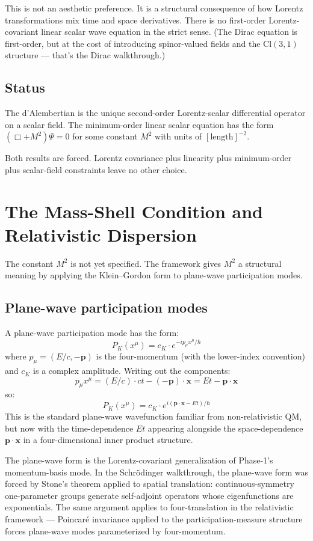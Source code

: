 \documentclass[11pt,a4paper]{article}
\begin{document}
This is not an aesthetic preference. It is a structural consequence of how Lorentz transformations mix time and space derivatives. There is no first-order Lorentz-covariant linear scalar wave equation in the strict sense. (The Dirac equation is first-order, but at the cost of introducing spinor-valued fields and the $\mathrm{Cl}(3,1)$ structure --- that's the Dirac walkthrough.)

\subsection{Status}

The d'Alembertian is the unique second-order Lorentz-scalar differential operator on a scalar field. The minimum-order linear scalar equation has the form $(\Box + M^2)\Psi = 0$ for some constant $M^2$ with units of $[\text{length}]^{-2}$.

Both results are forced. Lorentz covariance plus linearity plus minimum-order plus scalar-field constraints leave no other choice.

\section{The Mass-Shell Condition and Relativistic Dispersion}

The constant $M^2$ is not yet specified. The framework gives $M^2$ a structural meaning by applying the Klein--Gordon form to plane-wave participation modes.

\subsection{Plane-wave participation modes}

A plane-wave participation mode has the form:
\[
P_K(x^\mu) = c_K \cdot e^{-ip_\mu x^\mu/\hbar}
\]
where $p_\mu = (E/c, -\mathbf{p})$ is the four-momentum (with the lower-index convention) and $c_K$ is a complex amplitude. Writing out the components:
\[
p_\mu x^\mu = (E/c) \cdot ct - (-\mathbf{p})\cdot\mathbf{x} = Et - \mathbf{p}\cdot\mathbf{x}
\]
so:
\[
P_K(x^\mu) = c_K \cdot e^{i(\mathbf{p}\cdot\mathbf{x} - Et)/\hbar}
\]
This is the standard plane-wave wavefunction familiar from non-relativistic QM, but now with the time-dependence $Et$ appearing alongside the space-dependence $\mathbf{p}\cdot\mathbf{x}$ in a four-dimensional inner product structure.

The plane-wave form is the Lorentz-covariant generalization of Phase-1's momentum-basis mode. In the Schr\"odinger walkthrough, the plane-wave form was forced by Stone's theorem applied to spatial translation: continuous-symmetry one-parameter groups generate self-adjoint operators whose eigenfunctions are exponentials. The same argument applies to four-translation in the relativistic framework --- Poincar\'e invariance applied to the participation-measure structure forces plane-wave modes parameterized by four-momentum.
\end{document}
